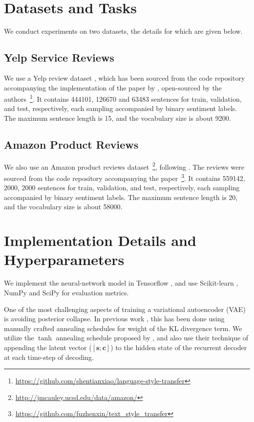 \section{Datasets and Tasks} \label{sec:datasets-tasks}

We conduct experiments on two datasets, the details for which are given below.

\subsection{Yelp Service Reviews}

We use a Yelp review dataset \citep{challenge2013yelp}, which has been sourced from the code repository accompanying the implementation of the paper by \cite{shen2017style}, open-sourced by the authors~\footnote{\url{https://github.com/shentianxiao/language-style-transfer}}. It contains 444101, 126670 and 63483 sentences for train, validation, and test, respectively, each sampling accompanied by binary sentiment labels. The maximum sentence length is 15, and the vocabulary size is about 9200.

\subsection{Amazon Product Reviews}

We also use an Amazon product reviews dataset~\footnote{\url{http://jmcauley.ucsd.edu/data/amazon/}}, following \cite{fu2017style}. The reviews were sourced from the code repository accompanying the paper~\footnote{\url{https://github.com/fuzhenxin/text_style_transfer}}. It contains 559142, 2000, 2000 sentences for train, validation, and test, respectively, each sampling accompanied by binary sentiment labels. The maximum sentence length is 20, and the vocabulary size is about 58000.


\section{Implementation Details and Hyperparameters}

We implement the neural-network model in Tensorflow \citep{abadi2016tensorflow}, and use Scikit-learn \citep{pedregosa2011scikit}, NumPy and SciPy for evaluation metrics.

One of the most challenging aspects of training a variational autoencoder (VAE) is avoiding posterior collapse. In previous work \citep{yang2017improved, bowman2016generating, bahuleyan2017variational}, this has been done using manually crafted annealing schedules for weight of the KL divergence term. We utilize the $\tanh$ annealing schedule proposed by \cite{bahuleyan2017variational}, and also use their technique of appending the latent vector ($[\bm s; \bm c]$) to the hidden state of the recurrent decoder at each time-step of decoding.

